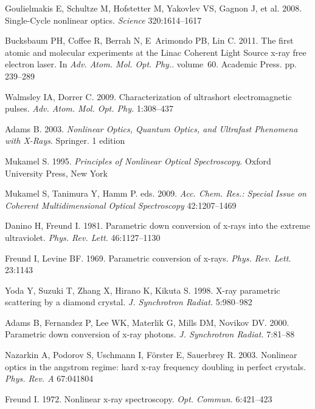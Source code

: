 \documentclass{ar-1col}
\begin{document}
\begin{thebibliography}{000}
Goulielmakis E, Schultze M, Hofstetter M, Yakovlev VS, Gagnon J, et al.
  2008. {Single-Cycle} nonlinear optics. \textit{Science} 320:1614--1617

Bucksbaum PH, Coffee R, Berrah N, E~Arimondo PB, Lin C. 2011. The first atomic
  and molecular experiments at the {Linac Coherent Light Source} {x-ray} free
  electron laser. In \textit{Adv. Atom. Mol. Opt. Phy.}. volume~60. Academic
  Press. pp. 239--289

Walmsley IA, Dorrer C. 2009. Characterization of ultrashort electromagnetic
  pulses. \textit{Adv. Atom. Mol. Opt. Phy.} 1:308--437

Adams B. 2003. \textit{Nonlinear Optics, Quantum Optics, and Ultrafast
  Phenomena with {X-Rays}}. Springer. 1 edition

Mukamel S. 1995. \textit{Principles of Nonlinear Optical Spectroscopy}. Oxford
  University Press, New York

Mukamel S, Tanimura Y, Hamm P. {eds.} 2009. \textit{Acc. Chem. Res.: Special
  Issue on Coherent Multidimensional Optical Spectroscopy} 42:1207--1469

Danino H, Freund I. 1981. Parametric down conversion of {x-rays} into the
  extreme ultraviolet. \textit{Phys. Rev. Lett.} 46:1127--1130

Freund I, Levine BF. 1969. Parametric conversion of {x-r}ays. \textit{Phys.
  Rev. Lett.} 23:1143

Yoda Y, Suzuki T, Zhang X, Hirano K, Kikuta S. 1998. {X-r}ay parametric
  scattering by a diamond crystal. \textit{J. Synchrotron Radiat.} 5:980--982

Adams B, Fernandez P, Lee WK, Materlik G, Mills DM, Novikov DV. 2000.
  Parametric down conversion of {x-ray} photons. \textit{J. Synchrotron
  Radiat.} 7:81--88

Nazarkin A, Podorov S, Uschmann I, F\"{o}rster E, Sauerbrey R. 2003. Nonlinear
  optics in the angstrom regime: hard {x-ray} frequency doubling in perfect
  crystals. \textit{Phys. Rev. A} 67:041804

Freund I. 1972. Nonlinear {x-ray} spectroscopy. \textit{Opt. Commun.}
  6:421--423


\end{thebibliography}
\end{document}
